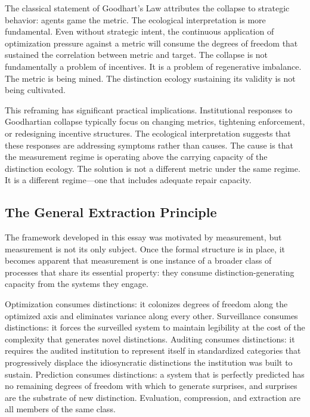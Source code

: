 \documentclass[12pt, a4paper]{article}
\theoremstyle{flyxion}
\begin{document}
The classical statement of Goodhart's Law attributes the collapse to strategic behavior: agents game the metric. The ecological interpretation is more fundamental. Even without strategic intent, the continuous application of optimization pressure against a metric will consume the degrees of freedom that sustained the correlation between metric and target. The collapse is not fundamentally a problem of incentives. It is a problem of regenerative imbalance. The metric is being mined. The distinction ecology sustaining its validity is not being cultivated.

This reframing has significant practical implications. Institutional responses to Goodhartian collapse typically focus on changing metrics, tightening enforcement, or redesigning incentive structures. The ecological interpretation suggests that these responses are addressing symptoms rather than causes. The cause is that the measurement regime is operating above the carrying capacity of the distinction ecology. The solution is not a different metric under the same regime. It is a different regime---one that includes adequate repair capacity.

\subsection*{The General Extraction Principle}

The framework developed in this essay was motivated by measurement, but measurement is not its only subject. Once the formal structure is in place, it becomes apparent that measurement is one instance of a broader class of processes that share its essential property: they consume distinction-generating capacity from the systems they engage.

Optimization consumes distinctions: it colonizes degrees of freedom along the optimized axis and eliminates variance along every other. Surveillance consumes distinctions: it forces the surveilled system to maintain legibility at the cost of the complexity that generates novel distinctions. Auditing consumes distinctions: it requires the audited institution to represent itself in standardized categories that progressively displace the idiosyncratic distinctions the institution was built to sustain. Prediction consumes distinctions: a system that is perfectly predicted has no remaining degrees of freedom with which to generate surprises, and surprises are the substrate of new distinction. Evaluation, compression, and extraction are all members of the same class.
\end{document}
